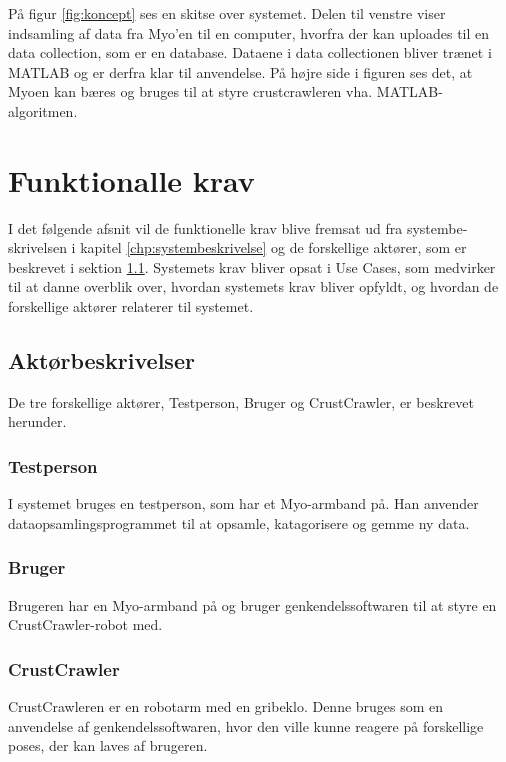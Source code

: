 På figur \ref{fig:koncept} ses en skitse over systemet. Delen til venstre viser indsamling af data fra Myo'en til en computer, hvorfra der kan uploades til en data collection, som er en database.  Dataene i data collectionen bliver trænet i MATLAB og er derfra klar til anvendelse. På højre side i figuren ses det, at Myoen kan bæres og bruges til at styre crustcrawleren vha. MATLAB-algoritmen.


\thispagestyle{fancy}
\section{Funktionalle krav}
\label{sec:funktionellekrav}
I det følgende afsnit vil de funktionelle krav blive fremsat ud fra systembe- skrivelsen i kapitel \ref{chp:systembeskrivelse} og de forskellige aktører, som er beskrevet i sektion \ref{sec:aktorbeskrivelser}.
Systemets krav bliver opsat i Use Cases, som medvirker til at danne overblik over, hvordan systemets krav bliver opfyldt, og hvordan de forskellige aktører relaterer til systemet.

\subsection{Aktørbeskrivelser}
\label{sec:aktorbeskrivelser}
De tre forskellige aktører, Testperson, Bruger og CrustCrawler, er beskrevet herunder.

\subsubsection{Testperson}
I systemet bruges en testperson, som har et Myo-armband på. Han anvender dataopsamlingsprogrammet til at opsamle, katagorisere og gemme ny data.

\subsubsection{Bruger}
Brugeren har en Myo-armband på og bruger genkendelssoftwaren til at styre en CrustCrawler-robot med.

\subsubsection{CrustCrawler}
CrustCrawleren er en robotarm med en gribeklo. Denne bruges som en anvendelse af genkendelssoftwaren, hvor den ville kunne reagere på forskellige poses, der kan laves af brugeren.

